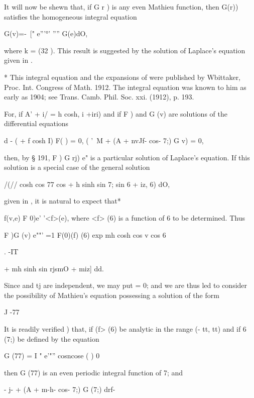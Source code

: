 
It will now be shewn that, if G r ) is any even Mathieu function, then
G(r)) satisfies the homogeneous integral equation

G(v)=-\ [" e'''°' '''' G(e)dO,

where k = \/(32 ). This result is suggested by the solution of
Laplace's equation given in .

* This integral equation and the expansions of  were published
by Wbittaker, Proc. Int. Congress of Math. 1912. The integral equation
was known to him as early as 1904; see Trans. Camb. Phil. Soc. xxi.
(1912), p. 193.

%
%

For, if A' + i/ = h cosh, i +iri) and if F ) and G (v) are solutions
of the differential equations

 d - ( + f cosh I) F( ) = 0, ( '\ M + (A + nvJf- cos- 7;) G v) = 0,

then, by § 191, F ) G rj) e" is a particular solution of Laplace's
equation. If this solution is a special case of the general solution

/(// cosh cos 77 cos + h sinh sin 7; sin 6 + iz, 6) dO,

given in , it is natural to expect that*

f(v,e) F 0)e' '<f>(e), where <f> (6) is a function of 6 to be
determined. Thus

F )G (v) e""' =1 F(0)(f) (6) exp mh cosh cos v cos 6

. -IT

+ mh sinh sin rjsmO + miz] dd.

Since and tj are independent, we may put = 0; and we are thus led to
consider the possibility of Mathieu's equation possessing a solution
of the form

J -77


It is readily verified ) that, if (f> (6) be analytic in the
range (- tt, tt) and if 6 (7;) be defined by the equation

G (77) = I " e'"'' cosncose ( ) 0

then G (77) is an even periodic integral function of 7; and

- j- + (A + m-h- cos- 7;) G (7;) drf-

